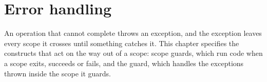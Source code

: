 \chapter{Error handling}%
\label{chap:error}

An operation that cannot complete throws an exception, and the exception leaves
every scope it crosses until something catches it. This chapter specifies the
constructs that act on the way out of a scope: scope guards, which run code when
a scope exits, succeeds or fails, and the  guard, which handles the
exceptions thrown inside the scope it guards.

\minitoc%



